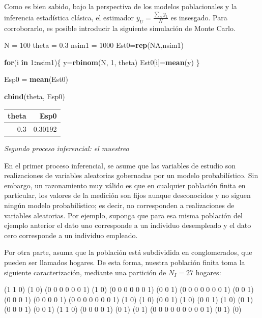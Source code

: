 \documentclass[
  12pt,
]{book}
\newenvironment{Shaded}{\begin{snugshade}}{\end{snugshade}}
\newcommand{\ConstantTok}[1]{\textcolor[rgb]{0.56,0.35,0.01}{#1}}
\newcommand{\ControlFlowTok}[1]{\textcolor[rgb]{0.13,0.29,0.53}{\textbf{#1}}}
\newcommand{\DecValTok}[1]{\textcolor[rgb]{0.00,0.00,0.81}{#1}}
\newcommand{\FloatTok}[1]{\textcolor[rgb]{0.00,0.00,0.81}{#1}}
\newcommand{\FunctionTok}[1]{\textcolor[rgb]{0.13,0.29,0.53}{\textbf{#1}}}
\newcommand{\NormalTok}[1]{#1}
\newcommand{\OtherTok}[1]{\textcolor[rgb]{0.56,0.35,0.01}{#1}}
\newcommand{\SpecialCharTok}[1]{\textcolor[rgb]{0.81,0.36,0.00}{\textbf{#1}}}
\begin{document}
Como es bien sabido, bajo la perspectiva de los modelos poblacionales y la inferencia estadística clásica, el estimador \(\bar{y}_U = \frac{\sum_U y_k}{N}\) es insesgado. Para corroborarlo, es posible introducir la siguiente simulación de Monte Carlo.

\begin{Shaded}
\begin{Highlighting}[]
\NormalTok{N }\OtherTok{=} \DecValTok{100}
\NormalTok{theta }\OtherTok{=} \FloatTok{0.3}
\NormalTok{nsim1 }\OtherTok{=} \DecValTok{1000}
\NormalTok{Est0}\OtherTok{=}\FunctionTok{rep}\NormalTok{(}\ConstantTok{NA}\NormalTok{,nsim1)}

\ControlFlowTok{for}\NormalTok{(i }\ControlFlowTok{in} \DecValTok{1}\SpecialCharTok{:}\NormalTok{nsim1)\{}
\NormalTok{y}\OtherTok{=}\FunctionTok{rbinom}\NormalTok{(N, }\DecValTok{1}\NormalTok{, theta)}
\NormalTok{Est0[i]}\OtherTok{=}\FunctionTok{mean}\NormalTok{(y)}
\NormalTok{\}}

\NormalTok{Esp0 }\OtherTok{=} \FunctionTok{mean}\NormalTok{(Est0)}

\FunctionTok{cbind}\NormalTok{(theta, Esp0)  }
\end{Highlighting}
\end{Shaded}

\begin{tabular}{r|r}
\hline
theta & Esp0\\
\hline
0.3 & 0.30192\\
\hline
\end{tabular}

\emph{Segundo proceso inferencial: el muestreo}

En el primer proceso inferencial, se asume que las variables de estudio son realizaciones de variables aleatorias gobernadas por un modelo probabilístico. Sin embargo, un razonamiento muy válido es que en cualquier población finita en particular, los valores de la medición son fijos aunque desconocidos y no siguen ningún modelo probabilístico;
es decir, no corresponden a realizaciones de variables aleatorias. Por ejemplo, suponga que para esa misma población del ejemplo anterior el dato uno corresponde a un individuo desempleado y el dato cero corresponde a un individuo empleado.

Por otra parte, asuma que la población está subdividida en conglomerados, que pueden ser llamados hogares. De esta forma, nuestra población finita toma la siguiente caracterización, mediante una partición de \(N_{I}=27\) hogares:

(1 1 0) (1 0) (0 0 0 0 0 0 1) (1 0) (0 0 0 0 0 0 1) (0 0
1) (0 0 0 0 0 0 0 1) (0 0 1) (0 0 0 1) (0 0 0 0 1) (0 0
0 0 0 0 0 1) (1 0) (1 0) (0 0 1) (1 0) (0 0 1) (1 0) (0 1)
(0 0 0 1) (0 0 1) (1 1 0) (0 0 0 0 1) (0 1) (0 1) (0 0 0 0
0 0 0 0 0 1) (0 1) (0)
\end{document}
